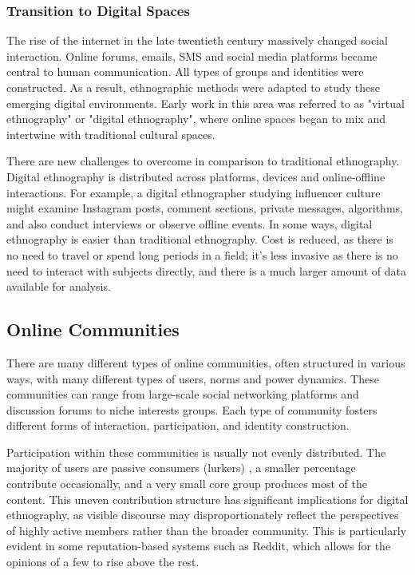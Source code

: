 \documentclass[12pt, a4paper]{article}
\begin{document}
\subsubsection{Transition to Digital Spaces}
The rise of the internet in the late twentieth century massively changed social interaction. Online forums, emails, SMS and social media platforms became central to human communication. All types of groups and identities were constructed. As a result, ethnographic methods were adapted to study these emerging digital environments. Early work in this area was referred to as "virtual ethnography" or "digital ethnography", where online spaces began to mix and intertwine with traditional cultural spaces.

There are new challenges to overcome in comparison to traditional ethnography. Digital ethnography is distributed across platforms, devices and online-offline interactions. For example, a digital ethnographer studying influencer culture might examine Instagram posts, comment sections, private messages, algorithms, and also conduct interviews or observe offline events. In some ways, digital ethnography is easier than traditional ethnography. Cost is reduced, as there is no need to travel or spend long periods in a field; it's less invasive as there is no need to interact with subjects directly, and there is a much larger amount of data available for analysis. \cite{cook2023ethnography}

\subsection{Online Communities}
There are many different types of online communities, often structured in various ways, with many different types of users, norms and power dynamics. These communities can range from large-scale social networking platforms and discussion forums to niche interests groups. Each type of community fosters different forms of interaction, participation, and identity construction.

Participation within these communities is usually not evenly distributed. The majority of users are passive consumers (lurkers) \cite{sun2014lurkers}, a smaller percentage contribute occasionally, and a very small core group produces most of the content. This uneven contribution structure has significant implications for digital ethnography, as visible discourse may disproportionately reflect the perspectives of highly active members rather than the broader community. This is particularly evident in some reputation-based systems such as Reddit, which allows for the opinions of a few to rise above the rest.
\end{document}
